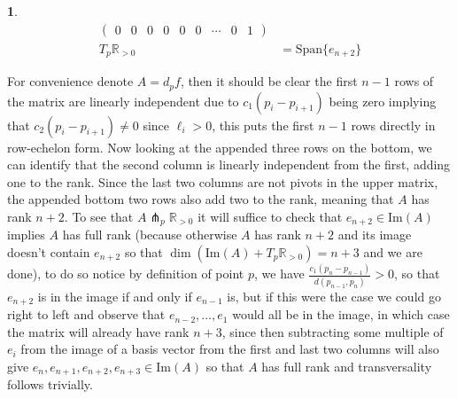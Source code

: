 \documentclass[10.5pt]{article}
\theoremstyle{definition}
\newtheorem{pb}{}
\newcommand{\set}[1]{\{#1\}}
\begin{document}
\begin{pb}
\begin{align*}
\begin{pmatrix}
                0 & 0 & 0 & 0 & 0 & 0 & \cdots & 0 & 1 
            \end{pmatrix} \\
            T_p\mathbb{R}_{>0} &= \text{Span}\set{e_{n+2}}
        \end{align*}
    \end{pb}
    For convenience denote \(A = d_pf\), then it should be clear the first \(n-1\) rows of the matrix are linearly independent due to \(c_1(p_i - p_{i+1})\) being zero implying that \(c_2(p_i - p_{i+1}) \neq 0\) since \(\ell_i > 0\), this puts the first \(n-1\) rows directly in row-echelon form. Now looking at the appended three rows on the bottom, we can identify that the second column is linearly independent from the first, adding one to the rank. Since the last two columns are not pivots in the upper matrix, the appended bottom two rows also add two to the rank, meaning that \(A\) has rank \(n + 2\). To see that \(A\pitchfork_p \mathbb{R}_{>0}\) it will suffice to check that \(e_{n+2} \in \text{Im}(A)\) implies \(A\) has full rank (because otherwise \(A\) has rank \(n+2\) and its image doesn't contain \(e_{n+2}\) so that \(\dim(\text{Im}(A) + T_p \mathbb{R}_{>0})=n+3\) and we are done), to do so notice by definition of point \(p\), we have \(\frac{c_1(p_n - p_{n-1})}{d(p_{n-1},p_n)} > 0\), so that \(e_{n+2}\) is in the image if and only if \(e_{n-1}\) is, but if this were the case we could go right to left and observe that \(e_{n-2}, \hdots , e_1\) would all be in the image, in which case the matrix will already have rank \(n + 3\), since then subtracting some multiple of \(e_i\) from the image of a basis vector from the first and last two columns will also give \(e_n,e_{n+1},e_{n+2},e_{n+3} \in \text{Im}(A)\) so that \(A\) has full rank and transversality follows trivially.
    
\end{document}
